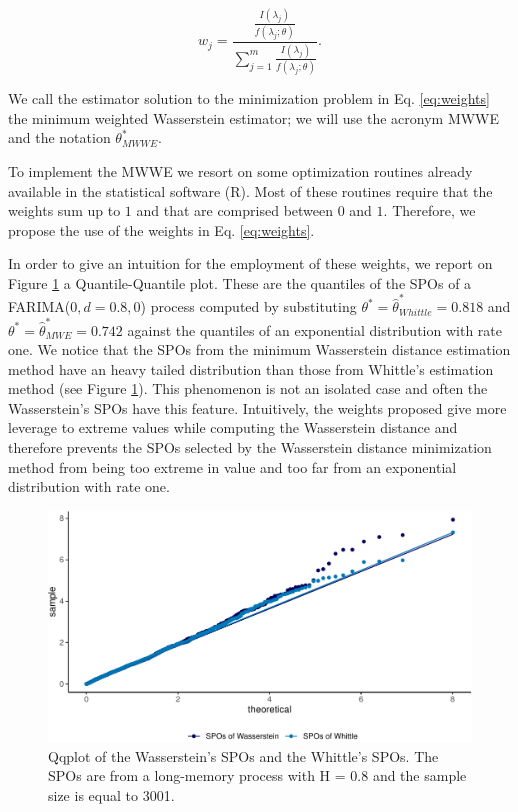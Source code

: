 \documentclass[
  11pt,
]{article}
\begin{document}
\begin{equation}
w_j = \frac{\frac{I(\lambda_j)}{f(\lambda_j; \theta)}}{\sum^m_{j = 1}\frac{I(\lambda_j)}{f(\lambda_j; \theta)}}.
\label{eq:weights}
\end{equation}

We call the estimator solution to the minimization problem in Eq.
\ref{eq:weights} the minimum weighted Wasserstein estimator; we will use
the acronym MWWE and the notation \(\theta^*_{MWWE}\).

To implement the MWWE we resort on some optimization routines already
available in the statistical software (R). Most of these routines
require that the weights sum up to \(1\) and that are comprised between
\(0\) and \(1\). Therefore, we propose the use of the weights in Eq.
\ref{eq:weights}.

In order to give an intuition for the employment of these weights, we
report on Figure \ref{fig:qqplot} a Quantile-Quantile plot. These are
the quantiles of the SPOs of a FARIMA(\(0,d = 0.8,0\)) process computed
by substituting \(\theta^* = \hat \theta^*_{Whittle} = 0.818\) and
\(\theta^* = \hat \theta^*_{MWE} = 0.742\) against the quantiles of an
exponential distribution with rate one. We notice that the SPOs from the
minimum Wasserstein distance estimation method have an heavy tailed
distribution than those from Whittle's estimation method (see Figure
\ref{fig:qqplot}). This phenomenon is not an isolated case and often the
Wasserstein's SPOs have this feature. Intuitively, the weights proposed
give more leverage to extreme values while computing the Wasserstein
distance and therefore prevents the SPOs selected by the Wasserstein
distance minimization method from being too extreme in value and too far
from an exponential distribution with rate one.

\begin{figure}

{\centering \includegraphics[width=0.6\linewidth]{Master_thesis_V5_files/figure-latex/qqplot-1} 

}

\caption{Qqplot of the Wasserstein's SPOs and the Whittle's SPOs. The SPOs are from a long-memory process with H = 0.8 and the sample size is equal to 3001.}\label{fig:qqplot}
\end{figure}
\end{document}
